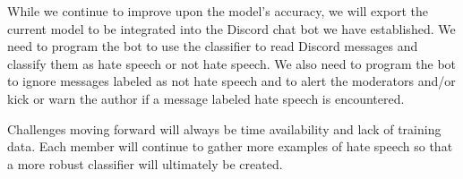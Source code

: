 \documentclass[conference]{sig-alternate-05-2015}
\begin{document}
While we continue to improve upon the model's accuracy, we will export the current model to be integrated into the Discord chat bot we have established. We need to program the bot to use the classifier to read Discord messages and classify them as hate speech or not hate speech. We also need to program the bot to ignore messages labeled as not hate speech and to alert the moderators and/or kick or warn the author if a message labeled hate speech is encountered.

Challenges moving forward will always be time availability and lack of training data.  Each member will continue to gather more examples of hate speech so that a more robust classifier will ultimately be created.  



\end{document}
